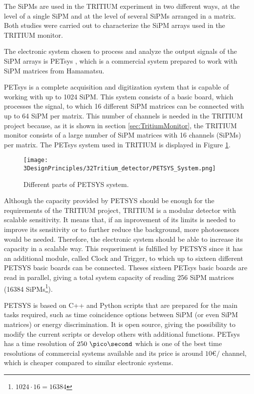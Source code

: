 The SiPMs are used in the TRITIUM experiment in two different ways, at the level of a single SiPM and at the level of several SiPMs arranged in a matrix. Both studies were carried out to characterize the SiPM arrays used in the TRITIUM monitor.

The electronic system chosen to process and analyze the output signals of the SiPM arrays is PETsys \cite{PETSYS}, which is a commercial system prepared to work with SiPM matrices from Hamamatsu.

PETsys is a complete acquisition and digitization system that is capable of working with up to 1024 SiPM. This system consists of a basic board, which processes the signal, to which 16 different SiPM matrices can be connected with up to 64 SiPM per matrix. This number of channels is needed in the TRITIUM project because, as it is shown in section \ref{sec:TritiumMonitor}, the TRITIUM monitor consists of a large number of SiPM matrices with 16 channels (SiPMs) per matrix. The PETsys system used in TRITIUM is displayed in Figure \ref{fig:PETSYS}.

\begin{figure}[htbp]
\centering
\texttt{[image: 3DesignPrinciples/32Tritium\_detector/PETSYS\_System.png]}
\caption{Different parts of PETSYS system.\label{fig:PETSYS}~\cite{PETSYS}}
\end{figure}

Although the capacity provided by PETSYS should be enough for the requirements of the TRITIUM project, TRITIUM is a modular detector with scalable sensitivity. It means that, if an inprovement of its limits is needed to improve its sensitivity or to further reduce the background, more photosensors would be needed. Therefore, the electronic system should be able to increase its capacity in a scalable way. This requeriment is fulfilled by PETSYS since it has an additional module, called Clock and Trigger, to which up to sixteen different PETSYS basic boards can be connected. Theses sixteen PETsys basic boards are read in parallel, giving a total system capacity of reading 256 SiPM matrices (16384 SiPMs\footnote{$1024\cdot{}16 = 16384$}). 

PETSYS is based on C++ and Python scripts that are prepared for the main tasks required, such as time coincidence options between SiPM (or even SiPM matrices) or energy discrimination. It is open source, giving the possibility to modify the current scripts or develop others with additional functions. PETsys has a time resolution of $250~\pico\second$ which is one of the best time resolutions of commercial systems available and its price is around $10$\euro$/$ channel, which is cheaper compared to similar electronic systems.

